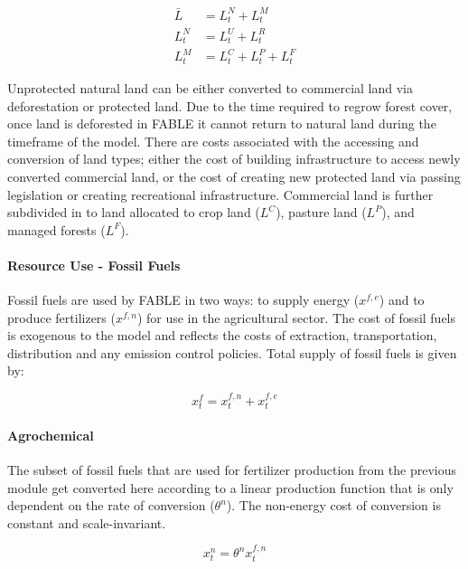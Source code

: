 \documentclass[10pt]{article}
\begin{document}
\begin{subequations}
\begin{align}
\bar{L} &= L_t^N + L_t^M \\
L_t^N &= L_t^U + L_t^R \\
L_t^M &= L_t^C + L_t^P + L_t^F
\end{align}
\end{subequations}

Unprotected natural land can be either converted to commercial land via deforestation or protected land. Due to the time required to regrow forest cover, once land is deforested in FABLE it cannot return to natural land during the timeframe of the model. There are costs associated with the accessing and conversion of land types; either the cost of building infrastructure to access newly converted commercial land, or the cost of creating new protected land via passing legislation or creating recreational infrastructure. Commercial land is further subdivided in to land allocated to crop land ($L^C$), pasture land ($L^P$), and managed forests ($L^F$). 

\paragraph{Resource Use - Fossil Fuels}

Fossil fuels are used by FABLE in two ways: to supply energy ($x^{f,e}$) and to produce fertilizers ($x^{f,n}$) for use in the agricultural sector. The cost of fossil fuels is exogenous to the model and reflects the costs of extraction, transportation, distribution and any emission control policies. Total supply of fossil fuels is given by:

\begin{equation}
x_t^f = x_t^{f,n} + x_t^{f,e}
\end{equation}

\paragraph{Agrochemical}

The subset of fossil fuels that are used for fertilizer production from the previous module get converted here according to a linear production function that is only dependent on the rate of conversion ($\theta^n$). The non-energy cost of conversion is constant and scale-invariant. 

\begin{equation}
x_t^n = \theta^n x_t^{f,n}
\end{equation}
\end{document}
